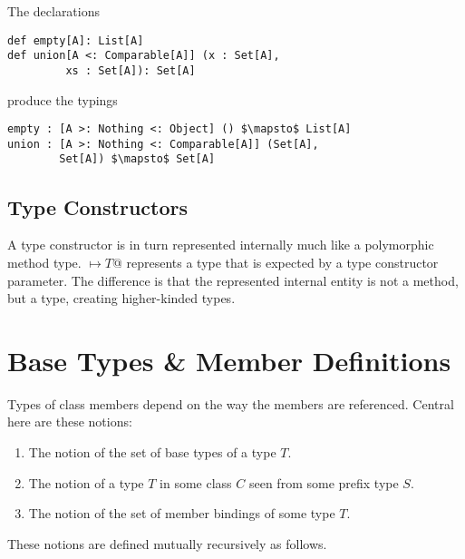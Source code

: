 \example The declarations
\begin{lstlisting}[escapechar=@,deletekeywords={union}]
def empty[A]: List[A]
def union[A <: Comparable[A]] (x : Set[A], 
         xs : Set[A]): Set[A]
\end{lstlisting}
produce the typings
\begin{lstlisting}[escapechar=@,deletekeywords={union}]
empty : [A >: Nothing <: Object] () $\mapsto$ List[A]
union : [A >: Nothing <: Comparable[A]] (Set[A], 
        Set[A]) $\mapsto$ Set[A]
\end{lstlisting}






\subsection{Type Constructors}
\label{sec:type-constructors}

A type constructor is in turn represented internally much like a polymorphic method type. \lstinline@[$\pm a_1$ >: $L_1$ <: $U_1 \commadots \pm a_n$ >: $L_n$ <: $U_n$] $\mapsto T$@ represents a type that is expected by a type constructor parameter. The difference is that the represented internal entity is not a method, but a type, creating higher-kinded types. 






\section{Base Types \& Member Definitions}
\label{sec:base-types}
\label{sec:member-definitions}

Types of class members depend on the way the members are referenced. Central here are these notions:
\begin{enumerate}
\item The notion of the set of base types of a type $T$.
\item The notion of a type $T$ in some class $C$ seen from some prefix type $S$.
\item The notion of the set of member bindings of some type $T$. 
\end{enumerate}

These notions are defined mutually recursively as follows. 

